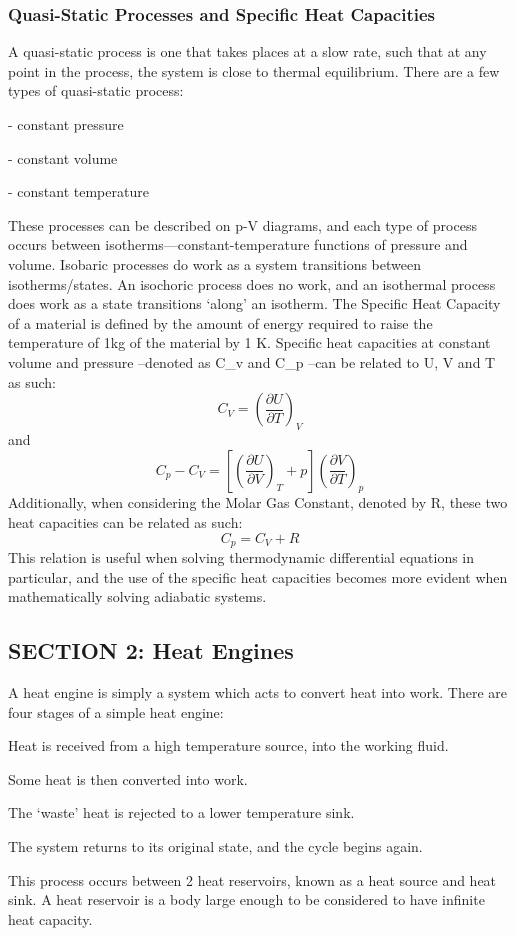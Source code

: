 \documentclass{physics-notes}
\begin{document}
\subsubsection{Quasi-Static Processes and Specific Heat Capacities}
A quasi-static process is one that takes places at a slow rate, such that at any point in the process, the system is close to thermal equilibrium. There are a few types of quasi-static process:
\begin{description}[font=$\bullet$~\normalfont\scshape]
	\item [ISOBARIC]	- constant pressure
	\item [ISOCHORIC]	- constant volume
	\item [ISOTHERMAL]	- constant temperature
\end{description}
These processes can be described on p-V diagrams, and each type of process occurs between isotherms—constant-temperature functions of pressure and volume. 
Isobaric processes do work as a system transitions between isotherms/states. An isochoric process does no work, and an isothermal process does work as a state transitions ‘along’ an isotherm.
The Specific Heat Capacity of a material is defined by the amount of energy required to raise the temperature of 1kg of the material by 1 K. Specific heat capacities at constant volume and pressure –denoted as C_v and C_p –can be related to U, V and T as such:
\begin{equation}
C_V = (\frac{\partial U}{\partial T})_V
\end{equation}
and
\begin{equation}
C_p - C_V = [(\frac{\partial U}{\partial V})_T + p](\frac{\partial V}{\partial T})_p
\end{equation}
Additionally, when considering the Molar Gas Constant, denoted by R, these two heat capacities can be related as such:
\begin{equation}
C_p = C_V + R
\end{equation}
This relation is useful when solving thermodynamic differential equations in particular, and the use of the specific heat capacities becomes more evident when mathematically solving adiabatic systems.
\subsection{SECTION 2: Heat Engines}
A heat engine is simply a system which acts to convert heat into work. 
There are four stages of a simple heat engine:
\begin{description}[font=$\bullet$~\normalfont\scshape]
	\item [i.]		Heat is received from a high temperature source, into the working fluid.
	\item [ii.]		Some heat is then converted into work.
	\item [iii.]	The ‘waste’ heat is rejected to a lower temperature sink.
	\item [iv.]		The system returns to its original state, and the cycle begins again.
\end{description}
This process occurs between 2 heat reservoirs, known as a heat source and heat sink. A heat reservoir is a body large enough to be considered to have infinite heat capacity.
\end{document}
